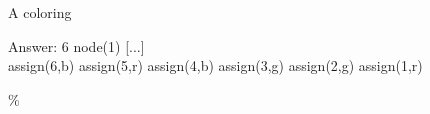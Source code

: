 
\begin{frame}[fragile]{A coloring}
\footnotesize
\begin{semiverbatim}
Answer: 6
node(1)   [...]    \\
\alert{assign(6,b) assign(5,r) assign(4,b) assign(3,g) assign(2,g) assign(1,r)}
\end{semiverbatim}
\pause
\medskip
\begin{center}

\end{center}
\end{frame}

\%
